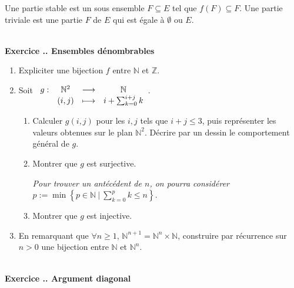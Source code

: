 \documentclass{article}
\newcommand{\fonction}[5]{\raisebox{-0.5\baselineskip}{$\begin{array}{lccc}
    #1: & #2 & \longrightarrow & #3 \\
        & #4 & \longmapsto & #5 \end{array}$}}
\newcommand{\mb}[1]{\mathbb{#1}}
\newcounter{exo}
\newcommand{\exercice}[1][\null]{\textbf{\\ Exercice \thesection.\theexo. #1} \addtocounter{exo}{1}}
\begin{document}
Une partie stable est un sous ensemble $F \subseteq E$ tel 
que $f(F) \subseteq F$. Une partie triviale est une partie $F$
de $E$ qui est égale à $\emptyset$ ou $E$.




\exercice[Ensembles dénombrables]

\begin{enumerate}

\item Expliciter une bijection $f$ entre $\mb{N}$ et $\mb{Z}$.

\item Soit $\fonction{g}{\mb{N}^2}{\mb{N}}{(i,j)}{ i + \sum_{k=0}^{i+j} k}$.

\begin{enumerate}

\item Calculer $g(i,j)$ pour les $i,j$ tels que $i+j \le 3$, puis représenter les valeurs obtenues sur le plan $\mb{N}^2$. Décrire par un dessin le comportement général de $g$.

\item Montrer que $g$ est surjective.

\emph{Pour trouver un antécédent de $n$, on pourra considérer $p := \min \left\{ p \in \mb{N}~|~ \sum_{k=0}^{p} k \le n\right\}$}.

\item Montrer que $g$ est injective.

\end{enumerate}

\item En remarquant que $\forall n \ge 1$, $\mb{N}^{n+1} = \mb{N}^n \times \mb{N}$, construire par récurrence sur $n > 0$ une bijection entre $\mb{N}$ et $\mb{N}^n$.

\end{enumerate}




\exercice[Argument diagonal]
\end{document}
